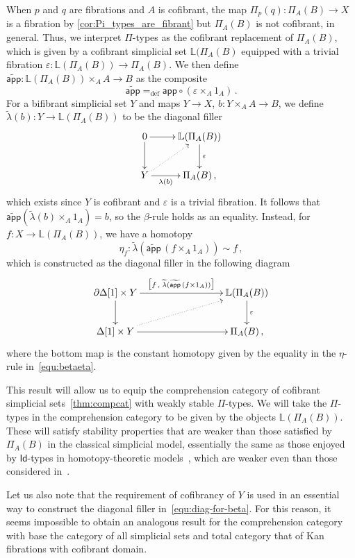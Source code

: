 \documentclass[reqno,10pt,a4paper,oneside]{amsart}
\numberwithin{equation}{section}
\theoremstyle{mythm}
\theoremstyle{mydef}
\theoremstyle{myrmk}
\newcommand{\defeq}{=_{\operatorname{def}}}
\newcommand{\co}{\colon}
\begin{document}
\begin{remark}
 When $p$ and $q$ are fibrations and $A$ is cofibrant, the map 
 $\Pi_p(q) \co \Pi_A(B) \to X$ is a fibration by \cref{cor:Pi_types_are_fibrant} but $\Pi_A(B)$ is not cofibrant,
 in general. Thus, we interpret  $\Pi$-types as the 
 cofibrant replacement  of $\Pi_A(B)$, which is given by a cofibrant simplicial set
 $\mathbb{L}(\Pi_A(B)$  equipped with
 a trivial fibration $\varepsilon \co \mathbb{L}(\Pi_A(B)) \to \Pi_A(B)$. 
We then define $\widetilde{\mathsf{app}} \co   \mathbb{L}(\Pi_A(B)) \times_A A \to B$ as the composite
\[
\widetilde{\mathsf{app}}  \defeq \mathsf{app} \circ (\varepsilon \times_A 1_A) \, .
\]
For a bifibrant simplicial set $Y$ and maps $Y \to X$,  $b \co Y \times_A A \to B$, we define $\widetilde{\lambda}(b) \co Y \to \mathbb{L}(\Pi_A(B))$ to be the
diagonal filler
\begin{equation}
\label{equ:diag-for-beta}
\begin{gathered}
\xymatrix{
0 \ar[r] \ar[d] & \mathbb{L}(\Pi_A(B))  \ar[d]^\varepsilon \\
Y \ar[r]_-{\lambda(b)} \ar@{.>}[ur] & \Pi_A(B) \, ,}
\end{gathered}
\end{equation} 
which exists since $Y$ is cofibrant and $\varepsilon$ is a trivial fibration. It follows 
that~$ \widetilde{\mathsf{app}}(\widetilde{\lambda}(b) \times_A 1_A) = b$, 
so the $\beta$-rule holds as an equality. Instead, for $f \co X \to \mathbb{L}(\Pi_A(B))$, we have a homotopy
\[
\eta_f  \co \widetilde{\lambda}( \widetilde{\mathsf{app}} \, (f \times_A 1_A)) \sim  f  \, ,
\]
which is constructed as the diagonal filler in the following diagram
\[
\xymatrix@C=3cm{
\partial \Delta[1] \times Y \ar[r]^-{\big[f \, , \;  \widetilde{\lambda} ( 
\widetilde{\mathsf{app}} \,  (f \times 1_A) ) \big]} \ar[d] & \mathbb{L}(\Pi_A(B)) \ar[d]^\varepsilon \\
\Delta[1] \times Y \ar[r] \ar@{.>}[ur] & \Pi_A(B) \, , }
\]
where the bottom map is the constant homotopy given by the equality in the $\eta$-rule in~\eqref{equ:betaeta}. 

This result will allow us to equip the comprehension category
of cofibrant simplicial sets~\cref{thm:compcat} with weakly stable $\Pi$-types. We 
will take the $\Pi$-types in the comprehension category to be given by the objects
$ \mathbb{L}(\Pi_A(B))$. These will satisfy  stability properties that are weaker than those satisfied by $\Pi_A(B)$ in the classical simplicial model, 
essentially the same as those enjoyed by $\mathsf{Id}$-types in homotopy-theoretic models~\cite{awodey-warren:homotopy-idtype}, which are weaker even than those considered in~\cite{CarboniA:locccec}.  

Let us also note that the requirement of cofibrancy of $Y$ is used in an 
essential way to construct the diagonal filler in~\eqref{equ:diag-for-beta}. For this
reason, it seems impossible to obtain an analogous result for the comprehension category 
with base the category of all simplicial sets and total category that of Kan fibrations 
with cofibrant domain.
\end{remark}
\end{document}
